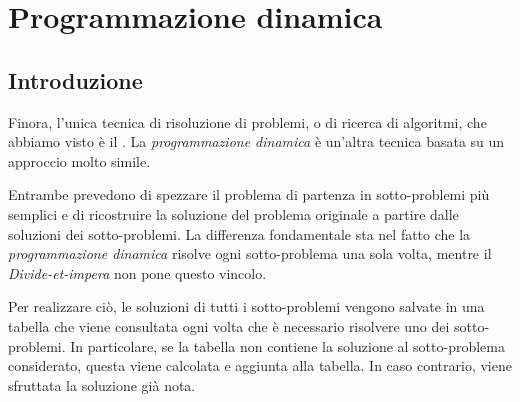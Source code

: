 \chapter{Programmazione dinamica}
\section{Introduzione}
Finora, l'unica tecnica di risoluzione di problemi, o di ricerca di algoritmi,
che abbiamo visto è il . La \emph{programmazione
dinamica} è un'altra tecnica basata su un approccio molto simile.

Entrambe prevedono di spezzare il problema di partenza in sotto-problemi più
semplici e di ricostruire la soluzione del problema originale a partire dalle
soluzioni dei sotto-problemi. La differenza fondamentale sta nel fatto che la
\emph{programmazione dinamica} risolve ogni sotto-problema una sola volta,
mentre il \emph{Divide-et-impera} non pone questo vincolo.

Per realizzare ciò, le soluzioni di tutti i sotto-problemi vengono salvate in
una tabella che viene consultata ogni volta che è necessario risolvere uno
dei sotto-problemi. In particolare, se la tabella non contiene la soluzione
al sotto-problema considerato, questa viene calcolata e aggiunta alla tabella.
In caso contrario, viene sfruttata la soluzione già nota.

